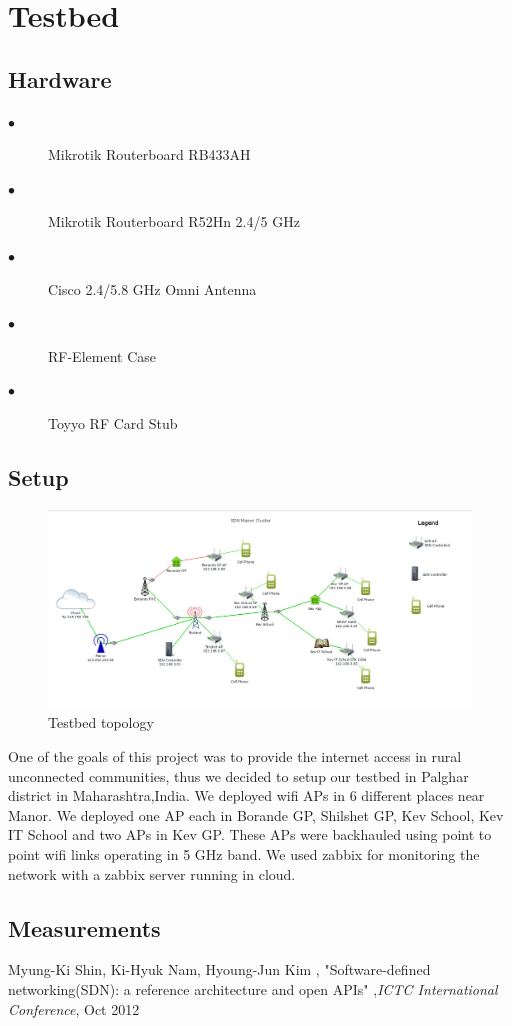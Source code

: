 \documentclass[12pt]{article}
\begin{document}
 
 \section{Testbed}
   \subsection{Hardware}
       \begin{description}
	   	\item[$\bullet$] Mikrotik Routerboard RB433AH 
	   	\item[$\bullet$] Mikrotik Routerboard R52Hn 2.4/5 GHz
	   	\item[$\bullet$] Cisco 2.4/5.8 GHz Omni Antenna
	   	\item[$\bullet$] RF-Element Case
	   	\item[$\bullet$] Toyyo RF Card Stub
	   	
	   	\end{description}
   	 \subsection{Setup}
   	\begin{figure}
   		\includegraphics[width=\linewidth]{testbed_setup.jpg}
   		\caption{Testbed topology}
   		\label{fig:boat1}
   	\end{figure}
   	 One of the goals of this project was to provide the internet access in rural unconnected communities, thus we decided to setup our testbed in Palghar district in Maharashtra,India. We deployed wifi APs in 6 different places near Manor. We deployed one AP each in Borande GP, Shilshet GP, Kev School, Kev IT School and two APs in Kev GP. These APs were backhauled using point to point wifi links operating in 5 GHz band. We used zabbix for monitoring the network with a zabbix server running in cloud.
   	 \subsection{Measurements}
   	 
   	 
   	   
   
    \begin{thebibliography}{1}
    	
    	Myung-Ki Shin, Ki-Hyuk Nam, Hyoung-Jun Kim , "Software-defined networking(SDN): a reference architecture and open APIs" ,\emph{ICTC International Conference}, Oct 2012
    \end{thebibliography}
    
  
\end{document}
